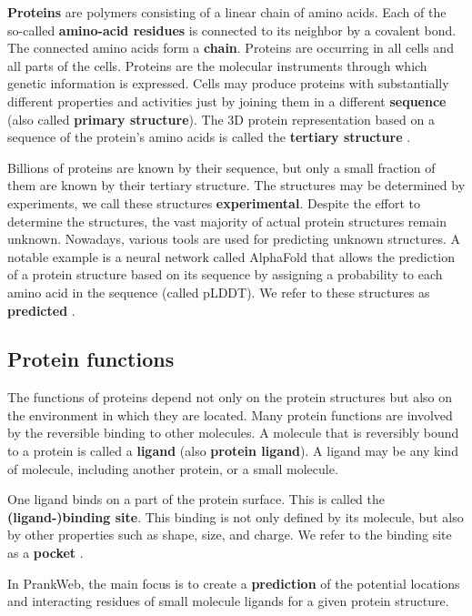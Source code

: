 \textbf{Proteins} are polymers consisting of a linear chain of amino acids. Each of the so-called \textbf{amino-acid residues} is connected to its neighbor by a covalent bond. The connected amino acids form a \textbf{chain}. Proteins are occurring in all cells and all parts of the cells. Proteins are the molecular instruments through which genetic information is expressed. Cells may produce proteins with substantially different properties and activities just by joining them in a different \textbf{sequence} (also called \textbf{primary structure}). The 3D protein representation based on a sequence of the protein's amino acids is called the \textbf{tertiary structure} \cite{nelson2008lehninger}.

Billions of proteins are known by their sequence, but only a small fraction of them are known by their tertiary structure. The structures may be determined by experiments, we call these structures \textbf{experimental}. Despite the effort to determine the structures, the vast majority of actual protein structures remain unknown. Nowadays, various tools are used for predicting unknown structures. A notable example is a neural network called AlphaFold that allows the prediction of a protein structure based on its sequence by assigning a probability to each amino acid in the sequence (called pLDDT). We refer to these structures as \textbf{predicted} \cite{jumper2021highly}.

\subsection{Protein functions}
\label{subsec:protein_functions}

The functions of proteins depend not only on the protein structures but also on the environment in which they are located. Many protein functions are involved by the reversible binding to other molecules. A molecule that is reversibly bound to a protein is called a \textbf{ligand} (also \textbf{protein ligand}). A ligand may be any kind of molecule, including another protein, or a small molecule.

One ligand binds on a part of the protein surface. This is called the \textbf{(ligand-)binding site}. This binding is not only defined by its molecule, but also by other properties such as shape, size, and charge. We refer to the binding site as a \textbf{pocket} \cite{nelson2008lehninger}.

In PrankWeb, the main focus is to create a \textbf{prediction} of the potential locations and interacting residues of small molecule ligands for a given protein structure. 

